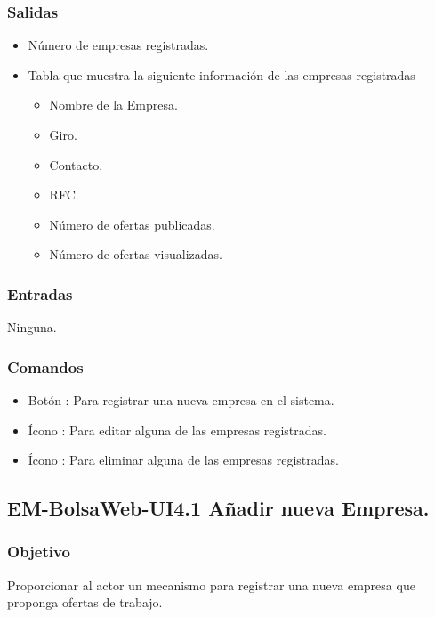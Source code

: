 \subsubsection{Salidas}
	\begin{itemize}
		\item Número de empresas registradas.
		\item Tabla que muestra la siguiente información de las empresas registradas
		\begin{itemize}
			\item Nombre de la Empresa.
			\item Giro.
			\item Contacto.
			\item RFC.
			\item Número de ofertas publicadas.
			\item Número de ofertas visualizadas. 
		\end{itemize}
	\end{itemize}

\subsubsection{Entradas}
	\noindent
	Ninguna.

\subsubsection{Comandos}
 	\begin{itemize}
		\item Botón : Para registrar una nueva empresa en el sistema.  
		\item Ícono : Para editar alguna de las empresas registradas.
		\item Ícono : Para eliminar alguna de las empresas registradas.
	\end{itemize}




\subsection{EM-BolsaWeb-UI4.1 Añadir nueva Empresa.}

\subsubsection{Objetivo}
	\noindent
	Proporcionar al actor un mecanismo para registrar una nueva empresa que proponga ofertas de trabajo.

